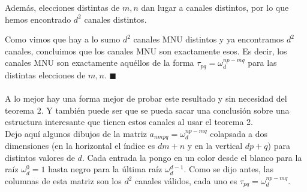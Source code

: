 Además, elecciones distintas de $m,n$ dan lugar a canales distintos, por lo que hemos encontrado $d^2$ canales distintos. 

Como vimos que hay a lo sumo $d^2$ canales MNU distintos y ya encontramos $d^2$ canales, concluimos que los canales MNU son exactamente esos. Es decir, los canales MNU son exactamente aquéllos de la forma $\tau_{pq}  =\omega_d^{np-mq}$ para las distintas elecciones de $m,n$. $\blacksquare$ \\ \\

A lo mejor hay una forma mejor de probar este resultado y sin necesidad del teorema 2. Y también puede ser que se pueda sacar una conclusión sobre una estructura interesante que tienen estos canales al usar el teorema 2. \\

Dejo aquí algunos dibujos de la matriz $a_{nmpq} = \omega_d^{np-mq}$ colapsada a dos dimensiones (en la horizontal el índice es $dm+n$ y en la vertical $dp+q$) para distintos valores de $d$. Cada entrada la pongo en un color desde el blanco para la raíz $\omega_d^0 = 1$ hasta negro para la última raíz $\omega_d^{d-1}$. Como se dijo antes, las columnas de esta matriz son los $d^2$ canales válidos, cada uno es $\tau_{pq} = \omega_d^{np-mq}$. 


